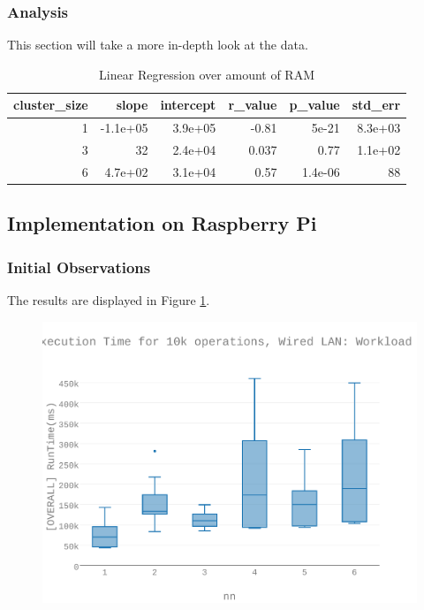 \subsubsection{Analysis}
This section will take a more in-depth look at the data.


\begin{table}[H]
\centering
\begin{tabular}{rrrrrr}
\toprule
 cluster\_size &    slope &  intercept &  r\_value &  p\_value &  std\_err \\
\midrule
            1 & -1.1e+05 &    3.9e+05 &    -0.81 &    5e-21 &  8.3e+03 \\
            3 &       32 &    2.4e+04 &    0.037 &     0.77 &  1.1e+02 \\
            6 &  4.7e+02 &    3.1e+04 &     0.57 &  1.4e-06 &       88 \\
\bottomrule
\end{tabular}
\caption{Linear Regression over amount of RAM}
\label{table:ram_v_ram_e}
\end{table}



\subsection{Implementation on Raspberry Pi}
\subsubsection{Initial Observations}
The results are displayed in Figure \ref{figures-wle_fig10}.  \begin{figure}[h]
\includegraphics[width=5.5in]{Figures/figures-wle_fig10.pdf}
\caption{}
\label{figures-wle_fig10}
\end{figure}



